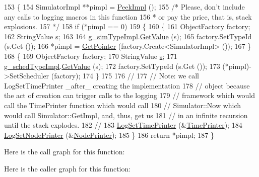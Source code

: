 \begin{DoxyCode}
153 \{
154   SimulatorImpl **pimpl = \hyperlink{group__simulator_ga233c5c38de117e4e4a5a9cd168694792}{PeekImpl} ();
155   \textcolor{comment}{/* Please, don't include any calls to logging macros in this function}
156 \textcolor{comment}{   * or pay the price, that is, stack explosions.}
157 \textcolor{comment}{   */}
158   \textcolor{keywordflow}{if} (*pimpl == 0)
159     \{
160       \{
161         ObjectFactory factory;
162         StringValue \hyperlink{generate__test__data__lte__sinr_8m_ad83eeb3a142285d1243a08c6b7026df8}{s};
163 
164         \hyperlink{group__simulator_ga590f49e0f2b8bb103fb0415beae2245a}{g\_simTypeImpl}.\hyperlink{classns3_1_1GlobalValue_aa33773cb952ba3c285a03ae2c4769b84}{GetValue} (s);
165         factory.SetTypeId (s.Get ());
166         *pimpl = \hyperlink{namespacens3_ab4e173cdfd43d17c1a40d5348510a670}{GetPointer} (factory.Create<SimulatorImpl> ());
167       \}
168       \{
169         ObjectFactory factory;
170         StringValue \hyperlink{generate__test__data__lte__sinr_8m_ad83eeb3a142285d1243a08c6b7026df8}{s};
171         \hyperlink{group__scheduler_ga8af85a17944949f1274576b38863d8f0}{g\_schedTypeImpl}.\hyperlink{classns3_1_1GlobalValue_aa33773cb952ba3c285a03ae2c4769b84}{GetValue} (s);
172         factory.SetTypeId (s.Get ());
173         (*pimpl)->SetScheduler (factory);
174       \}
175 
176 \textcolor{comment}{//}
177 \textcolor{comment}{// Note: we call LogSetTimePrinter \_after\_ creating the implementation}
178 \textcolor{comment}{// object because the act of creation can trigger calls to the logging }
179 \textcolor{comment}{// framework which would call the TimePrinter function which would call }
180 \textcolor{comment}{// Simulator::Now which would call Simulator::GetImpl, and, thus, get us }
181 \textcolor{comment}{// in an infinite recursion until the stack explodes.}
182 \textcolor{comment}{//}
183       \hyperlink{namespacens3_acf6a1749b3febc5a6a5b2b8620138d80}{LogSetTimePrinter} (&\hyperlink{group__logging_gaaad3642e8247a056cd83001d805b0812}{TimePrinter});
184       \hyperlink{namespacens3_aa6e659ca357c8309352fa0f146793810}{LogSetNodePrinter} (&\hyperlink{group__logging_gaaffbf70ff3766cd62b8bbd9b140d2a1b}{NodePrinter});
185     \}
186   \textcolor{keywordflow}{return} *pimpl;
187 \}
\end{DoxyCode}


Here is the call graph for this function\+:




Here is the caller graph for this function\+:


